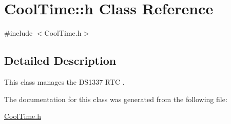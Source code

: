 \hypertarget{class_cool_time_1_1h}{}\section{Cool\+Time\+:\+:h Class Reference}
\label{class_cool_time_1_1h}


{\ttfamily \#include $<$Cool\+Time.\+h$>$}



\subsection{Detailed Description}
This class manages the D\+S1337 R\+TC . 

The documentation for this class was generated from the following file\+:\begin{DoxyCompactItemize}
\item 
\hyperlink{_cool_time_8h}{Cool\+Time.\+h}\end{DoxyCompactItemize}
